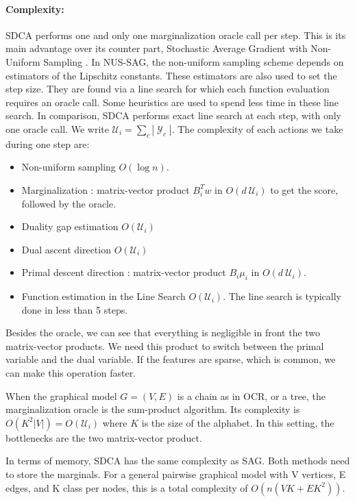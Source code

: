 \documentclass{article}
\DeclareMathOperator{\1}{\mathbb{1}}
\DeclareMathOperator{\Y}{\mathcal{Y}}
\begin{document}
\paragraph{Complexity:}
SDCA performs one and only one marginalization oracle call per step.
This is its main advantage over its counter part, Stochastic Average Gradient with Non-Uniform Sampling \cite{schmidt_non-uniform_2015}.
In NUS-SAG, the non-uniform sampling scheme depends on estimators of the Lipschitz constants.
These estimators are also used to set the step size.
They are found via a line search for which each function evaluation requires an oracle call.
Some heuristics are used to spend less time in these line search.
In comparison, SDCA performs exact line search at each step, with only one oracle call.
We write $\mathcal U_i = \sum_c |\Y_c|$. The complexity of each actions we take during one step are:
\begin{itemize}
	\item Non-uniform sampling $O(\log n)$.
	\item Marginalization : matrix-vector product $B_i^Tw$ in $O(d \ \mathcal U_i)$ to get the score, followed by the oracle.
	\item Duality gap estimation $O(\mathcal U_i)$
	\item Dual ascent direction $O(\mathcal U_i)$
	\item Primal descent direction : matrix-vector product $B_i \mu_i$ in $O(d \ \mathcal U_i)$.
	\item Function estimation in the Line Search $O(\mathcal U_i)$. The line search is typically done in less than 5 steps.
\end{itemize}
Besides the oracle, we can see that everything is negligible in front the two matrix-vector products.
We need this product to switch between the primal variable and the dual variable.
If the features are sparse, which is common, we can make this operation faster.

When the graphical model $G=(V,E)$ is a chain as in OCR, or a tree, the marginalization oracle is the sum-product algorithm.
Its complexity is $O(K^2 |V|) = O(\mathcal U_i)$ where $K$ is the size of the alphabet.
In this setting, the bottlenecks are the two matrix-vector product.

In terms of memory, SDCA has the same complexity as SAG. 
Both methods need to store the marginals.
For a general pairwise graphical model with V vertices, E edges, and K class per nodes, this is a total complexity of $O(n(VK + EK^2))$.
\end{document}
